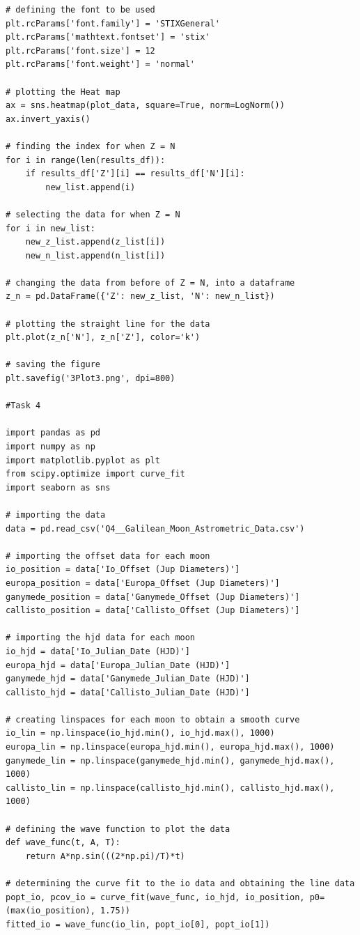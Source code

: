 \documentclass[12pt, a4paper]{article}
\begin{document}
\begin{verbatim}
# defining the font to be used
plt.rcParams['font.family'] = 'STIXGeneral'
plt.rcParams['mathtext.fontset'] = 'stix'
plt.rcParams['font.size'] = 12
plt.rcParams['font.weight'] = 'normal'

# plotting the Heat map
ax = sns.heatmap(plot_data, square=True, norm=LogNorm())
ax.invert_yaxis()

# finding the index for when Z = N
for i in range(len(results_df)):
    if results_df['Z'][i] == results_df['N'][i]:
        new_list.append(i)

# selecting the data for when Z = N
for i in new_list:
    new_z_list.append(z_list[i])
    new_n_list.append(n_list[i])

# changing the data from before of Z = N, into a dataframe
z_n = pd.DataFrame({'Z': new_z_list, 'N': new_n_list}) 

# plotting the straight line for the data
plt.plot(z_n['N'], z_n['Z'], color='k')

# saving the figure
plt.savefig('3Plot3.png', dpi=800)

#Task 4

import pandas as pd
import numpy as np
import matplotlib.pyplot as plt
from scipy.optimize import curve_fit
import seaborn as sns

# importing the data 
data = pd.read_csv('Q4__Galilean_Moon_Astrometric_Data.csv')

# importing the offset data for each moon
io_position = data['Io_Offset (Jup Diameters)']
europa_position = data['Europa_Offset (Jup Diameters)']
ganymede_position = data['Ganymede_Offset (Jup Diameters)']
callisto_position = data['Callisto_Offset (Jup Diameters)']

# importing the hjd data for each moon
io_hjd = data['Io_Julian_Date (HJD)']
europa_hjd = data['Europa_Julian_Date (HJD)']
ganymede_hjd = data['Ganymede_Julian_Date (HJD)']
callisto_hjd = data['Callisto_Julian_Date (HJD)']

# creating linspaces for each moon to obtain a smooth curve
io_lin = np.linspace(io_hjd.min(), io_hjd.max(), 1000)
europa_lin = np.linspace(europa_hjd.min(), europa_hjd.max(), 1000)
ganymede_lin = np.linspace(ganymede_hjd.min(), ganymede_hjd.max(), 1000)
callisto_lin = np.linspace(callisto_hjd.min(), callisto_hjd.max(), 1000)

# defining the wave function to plot the data
def wave_func(t, A, T):
    return A*np.sin(((2*np.pi)/T)*t)

# determining the curve fit to the io data and obtaining the line data
popt_io, pcov_io = curve_fit(wave_func, io_hjd, io_position, p0=(max(io_position), 1.75))
fitted_io = wave_func(io_lin, popt_io[0], popt_io[1])


\end{verbatim}
\end{document}
